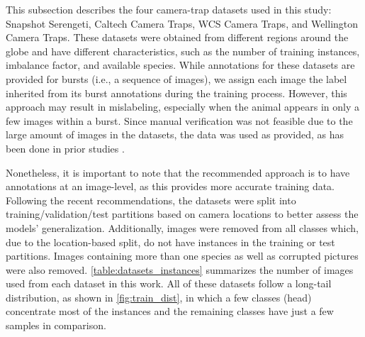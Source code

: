 This subsection describes the four camera-trap datasets used in this study:
Snapshot Serengeti, Caltech Camera Traps, WCS Camera Traps, and Wellington
Camera Traps. These datasets were obtained from different regions around the
globe and have different characteristics, such as the number of training
instances, imbalance factor, and available species. While annotations for these
datasets are provided for bursts (i.e., a sequence of images), we assign
each image the label inherited from its burst annotations during the training
process. However, this approach may result in mislabeling, especially when the
animal appears in only a few images within a burst. Since manual verification
was not feasible due to the large amount of images in the datasets, the data
was used as provided, as has been done in prior studies \citep{villa2017towards,
norouzzadeh2018automatically}. 

Nonetheless, it is important to note that the
recommended approach is to have annotations at an image-level, as this provides
more accurate training data. Following the recent recommendations, the datasets
were split into training/validation/test partitions based on camera locations to
better assess the models’ generalization. Additionally, images were removed from
all classes which, due to the location-based split, do not have instances in the
training or test partitions. Images containing more than one species as well as
corrupted pictures were also removed. \autoref{table:datasets_instances}
summarizes the number of images used from each dataset in this work. All of
these datasets follow a long-tail distribution, as shown in
\autoref{fig:train_dist}, in which a few classes (head) concentrate most of the
instances and the remaining classes have just a few samples in comparison.

